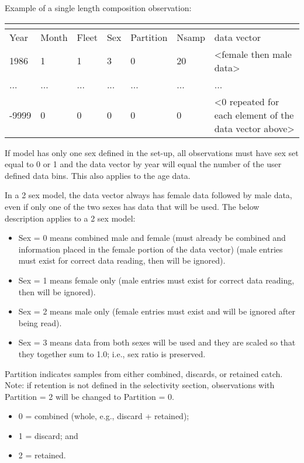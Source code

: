 Example of a single length composition observation:
\vspace*{-1cm} %
\begin{center}
	\begin{tabular}{p{1.5cm} p{1.5cm} p{1.5cm} p{1.5cm} p{1.5cm} p{1.5cm} p{5cm}}
		\multicolumn{7}{l}{} \\
		\hline
		Year & Month & Fleet & Sex & Partition & Nsamp & data vector \Tstrut\Bstrut\\
		\hline
		1986 & 1 & 1 & 3 & 0 & 20 & <female then male data> \Tstrut\\
		... & ... & ... & ... & ... & ... & ... \\
		-9999 & 0 & 0 & 0 & 0 & 0 & <0 repeated for each element of the data vector above> \Bstrut\\
		\hline	
	\end{tabular}
	\leavevmode\tagmcend\tagstructend\par
\end{center}

If model has only one sex defined in the set-up, all observations must have sex set equal to 0 or 1 and the data vector by year will equal the number of the user defined data bins. This also applies to the age data. 

In a 2 sex model, the data vector always has female data followed by male data, even if only one of the two sexes has data that will be used. The below description applies to a 2 sex model:
	\begin{itemize}
		\item Sex = 0 means combined male and female (must already be combined and information placed in the female portion of the data vector) (male entries must exist for correct data reading, then will be ignored).
		\item Sex = 1 means female only (male entries must exist for correct data reading, then will be ignored).
		\item Sex = 2 means male only (female entries must exist and will be ignored after being read).
		\item Sex = 3 means data from both sexes will be used and they are scaled so that they together sum to 1.0; i.e., sex ratio is preserved.
	\end{itemize}

Partition indicates samples from either combined, discards, or retained catch. 
Note: if retention is not defined in the selectivity section, observations with Partition = 2 will be changed to Partition = 0.
	\begin{itemize}
		\item 0 = combined (whole, e.g., discard + retained);
		\item 1 = discard; and
		\item 2 = retained.
	\end{itemize}

